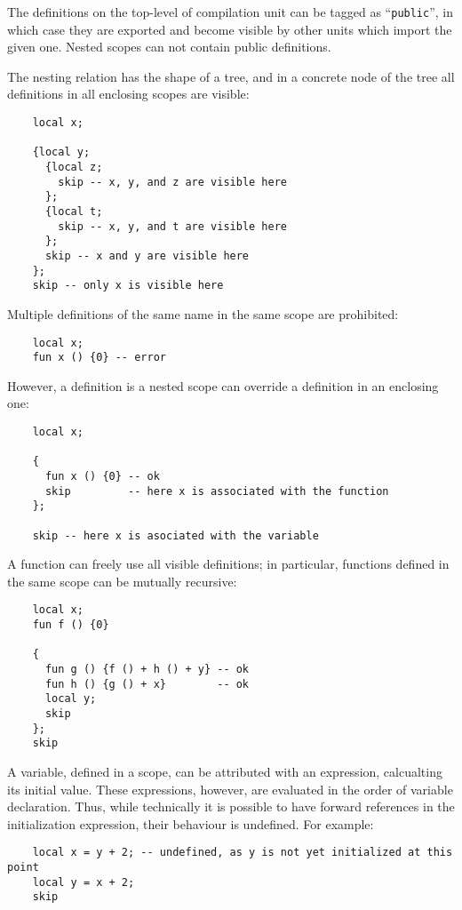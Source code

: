 The definitions on the top-level of compilation unit can be tagged as ``\lstinline|public|'', in which case they are exported and become visible by
other units which import the given one. Nested scopes can not contain public definitions.

The nesting relation has the shape of a tree, and in a concrete node of the tree all definitions in all enclosing scopes are visible:

\begin{lstlisting}
    local x;

    {local y; 
      {local z;
        skip -- x, y, and z are visible here
      };
      {local t;
        skip -- x, y, and t are visible here
      };
      skip -- x and y are visible here
    };
    skip -- only x is visible here
\end{lstlisting}

Multiple definitions of the same name in the same scope are prohibited:

\begin{lstlisting}
    local x;
    fun x () {0} -- error
\end{lstlisting}

However, a definition is a nested scope can override a definition in an enclosing one:

\begin{lstlisting}
    local x;

    {
      fun x () {0} -- ok
      skip         -- here x is associated with the function
    };

    skip -- here x is asociated with the variable
\end{lstlisting}

A function can freely use all visible definitions; in particular, functions defined in the
same scope can be mutually recursive:

\begin{lstlisting}
    local x;
    fun f () {0}

    { 
      fun g () {f () + h () + y} -- ok
      fun h () {g () + x}        -- ok
      local y;
      skip
    };
    skip
\end{lstlisting}

A variable, defined in a scope, can be attributed with an expression, calcualting its initial value.
These expressions, however, are evaluated in the order of variable declaration. Thus, while
technically it is possible to have forward references in the initialization expression, their
behaviour is undefined. For example:

\begin{lstlisting}
    local x = y + 2; -- undefined, as y is not yet initialized at this point
    local y = x + 2;
    skip
\end{lstlisting}
